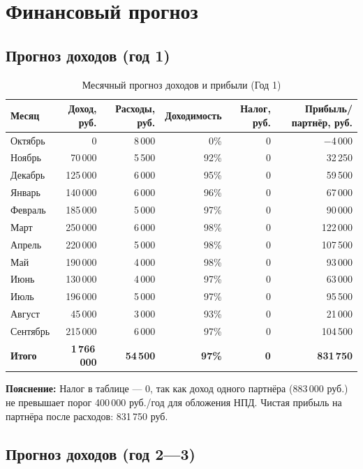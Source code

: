\documentclass[12pt,a4paper]{article}
\begin{document}
\section{Финансовый прогноз}

\subsection{Прогноз доходов (год 1)}

\begin{table}[H]
\centering
\caption{Месячный прогноз доходов и прибыли (Год 1)}
\label{tab:year1_forecast}
\begin{tabular}{lrrrrr}
\toprule
Месяц & Доход, руб. & Расходы, руб. & Доходимость & Налог, руб. & Прибыль/партнёр, руб. \\
\midrule
Октябрь & 0 & 8\,000 & 0\% & 0 & $-$4\,000 \\
Ноябрь & 70\,000 & 5\,500 & 92\% & 0 & 32\,250 \\
Декабрь & 125\,000 & 6\,000 & 95\% & 0 & 59\,500 \\
Январь & 140\,000 & 6\,000 & 96\% & 0 & 67\,000 \\
Февраль & 185\,000 & 5\,000 & 97\% & 0 & 90\,000 \\
Март & 250\,000 & 6\,000 & 98\% & 0 & 122\,000 \\
Апрель & 220\,000 & 5\,000 & 98\% & 0 & 107\,500 \\
Май & 190\,000 & 4\,000 & 98\% & 0 & 93\,000 \\
Июнь & 130\,000 & 4\,000 & 97\% & 0 & 63\,000 \\
Июль & 196\,000 & 5\,000 & 97\% & 0 & 95\,500 \\
Август & 45\,000 & 3\,000 & 93\% & 0 & 21\,000 \\
Сентябрь & 215\,000 & 6\,000 & 97\% & 0 & 104\,500 \\
\midrule
\textbf{Итого} & \textbf{1\,766\,000} & \textbf{54\,500} & \textbf{97\%} & \textbf{0} & \textbf{831\,750} \\
\bottomrule
\end{tabular}
\end{table}

\textbf{Пояснение:} Налог в таблице --- 0, так как доход одного партнёра (883\,000 руб.) не превышает порог 400\,000 руб./год для обложения НПД. Чистая прибыль на партнёра после расходов: 831\,750 руб.

\subsection{Прогноз доходов (год 2---3)}
\end{document}
